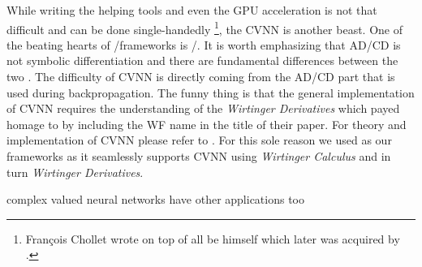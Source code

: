 While writing the helping tools and even the \ac{GPU} acceleration is not that difficult and can be done single-handedly
\footnote{Fran\c{c}ois Chollet wrote \keras\cite{Chollet2023} on top of \tensorflow\cite{Abadi2016} all be himself which later was acquired by \google.}, the \ac{CVNN} is another beast. 
One of the beating hearts of \ml/\dl frameworks is \ad/\cd. It is worth emphasizing that \ac{AD}/\ac{CD} is not symbolic differentiation and there are fundamental differences between the two \cite{Naumann2011}\cite{Griewank2008}. 
The difficulty of \ac{CVNN}\cite{CTOBYZDSSSJFSSMNRYBCP2017}\cite{Bassey2021}\cite{Barrachina2023} is directly coming from the \ac{AD}/\ac{CD} part 
that is used during backpropagation. The funny thing is that the general implementation of \ac{CVNN} requires the understanding of the 
\emph{Wirtinger Derivatives}\cite{Wirtinger1927} which \cite{Candes2014} payed homage to by including the \ac{WF} name in the title of their paper\cite{Candes2014}. 
For theory and implementation of \ac{CVNN} please refer to \cite{Wirtinger1927}\cite{KreutzDelgado2009}\cite{Bassey2021}\cite{Barrachina2023}\cite{CTOBYZDSSSJFSSMNRYBCP2017}. For this sole reason 
we used \pytorch\cite{Paszke2019} as our frameworks as it seamlessly supports \ac{CVNN} using \emph{Wirtinger Calculus}\cite{Fischer2002} and in turn 
\emph{Wirtinger Derivatives}\cite{Wirtinger1927}.




complex valued neural networks have other applications too \cite{Bassey2021} \cite{Barrachina2023} \cite{CTOBYZDSSSJFSSMNRYBCP2017}


\cite{Wirtinger1927} \cite{KreutzDelgado2009} \cite{Fischer2002}




